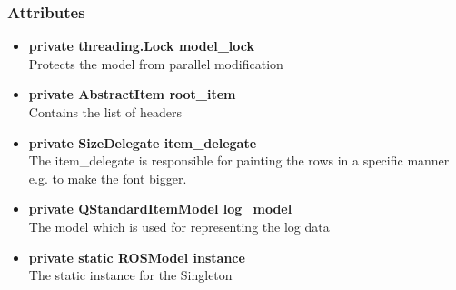\subsubsection{Attributes}
\begin{itemize}
  \item \textbf{private threading.Lock model\_lock}\\ 
  Protects the model from parallel modification
  \item \textbf{private AbstractItem root\_item}\\
  Contains the list of headers
  \item \textbf{private SizeDelegate item\_delegate}\\
  The item\_delegate is responsible for painting the rows in a specific manner e.g. to make the font bigger.
  \item \textbf{private QStandardItemModel log\_model}\\ The model which is used for representing the log data
  \item \textbf{private static ROSModel instance}\\
   The static instance for the Singleton
   
\end{itemize}
